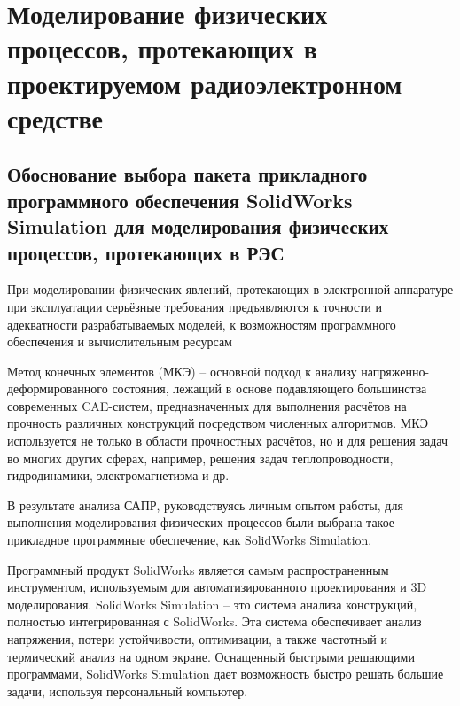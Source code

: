 \section{Моделирование 
  физических процессов,
  протекающих в проектируемом
  радиоэлектронном средстве}

  
  


\subsection{Обоснование выбора пакета
 прикладного программного обеспечения 
 SolidWorks Simulation
 для моделирования физических процессов, протекающих в РЭС}

При моделировании физических явлений, протекающих в электронной
аппаратуре при эксплуатации серьёзные требования предъявляются к
точности и адекватности разрабатываемых моделей, к возможностям
программного обеспечения и вычислительным ресурсам

Метод конечных элементов (МКЭ) – основной подход к анализу
напряженно-деформированного состояния, лежащий в основе подавляющего
большинства современных CAE-систем, предназначенных для выполнения
расчётов на прочность различных конструкций посредством численных
алгоритмов. МКЭ используется не только в области прочностных
расчётов, но и для решения задач во многих других сферах, например,
решения задач теплопроводности, гидродинамики, электромагнетизма и др.

В результате анализа САПР, руководствуясь личным опытом работы, для
выполнения моделирования физических процессов были выбрана такое
прикладное программные обеспечение, как SolidWorks Simulation.


Программный продукт SolidWorks является самым распространенным
инструментом, используемым для автоматизированного проектирования и 3D
моделирования. SolidWorks Simulation – это система анализа
конструкций, полностью интегрированная с SolidWorks. Эта система
обеспечивает анализ напряжения, потери устойчивости, оптимизации, а
также частотный и термический анализ на одном экране. Оснащенный
быстрыми решающими программами, SolidWorks Simulation дает возможность
быстро решать большие задачи, используя персональный компьютер.

